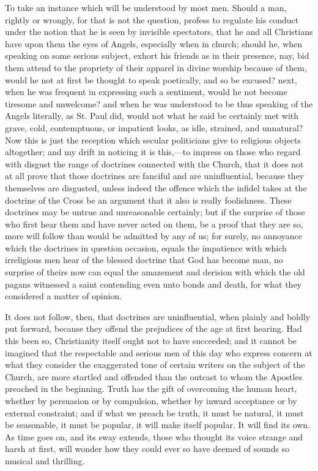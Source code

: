To take an instance which will be understood by most men. Should a
man, rightly or wrongly, for that is not the question, profess to
regulate his conduct under the notion that he is seen by invisible
spectators, that he and all Christians have upon them the eyes of
Angels, especially when in church; should he, when speaking on some
serious subject, exhort his friends as in their presence, nay, bid
them attend to the propriety of their apparel in divine worship
because of them, would he not at first be thought to speak poetically,
and so be excused? next, when he was frequent in expressing such a
sentiment, would he not become tiresome and unwelcome? and when he was
understood to be thus speaking of the Angels literally, as St. Paul
did, would not what he said be certainly met with grave, cold,
contemptuous, or impatient looks, as idle, strained, and unnatural?
Now this is just the reception which secular politicians give to
religious objects altogether; and my drift in noticing it is this,—to
impress on those who regard with disgust the range of doctrines
connected with the Church, that it does not at all prove that those
doctrines are fanciful and are uninfluential, because they themselves
are disgusted, unless indeed the offence which the infidel takes at
the doctrine of the Cross be an argument that it also is really foolishness. These doctrines may be untrue and unreasonable certainly;
but if the surprise of those who first hear them and have never acted
on them, be a proof that they are so, more will follow than would be
admitted by any of us; for surely, no annoyance which the doctrines in
question occasion, equals the impatience with which irreligious men
hear of the blessed doctrine that God has become man, no surprise of
theirs now can equal the amazement and derision with which the old
pagans witnessed a saint contending even unto bonds and death, for
what they considered a matter of opinion.

It does not follow, then, that doctrines are uninfluential, when
plainly and boldly put forward, because they offend the prejudices of
the age at first hearing. Had this been so, Christianity itself ought
not to have succeeded; and it cannot be imagined that the respectable
and serious men of this day who express concern at what they consider
the exaggerated tone of certain writers on the subject of the Church,
are more startled and offended than the outcast to whom the Apostles
preached in the beginning. Truth has the gift of overcoming the human
heart, whether by persuasion or by compulsion, whether by inward
acceptance or by external constraint; and if what we preach be truth,
it must be natural, it must be seasonable, it must be popular, it will
make itself popular. It will find its own. As time goes on, and its
sway extends, those who thought its voice strange and harsh at first,
will wonder how they could ever so have deemed of sounds so musical
and thrilling.

